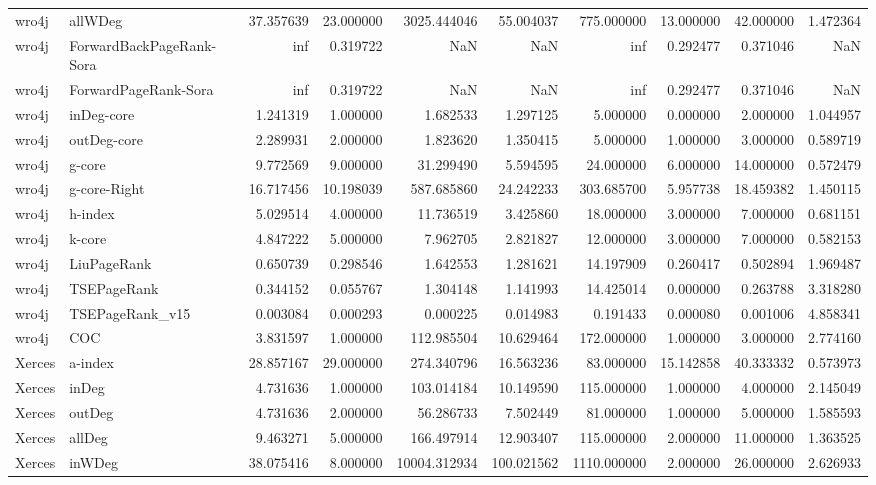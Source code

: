 \begin{tabular}{llrrrrrrrr}
wro4j & allWDeg & 37.357639 & 23.000000 & 3025.444046 & 55.004037 & 775.000000 & 13.000000 & 42.000000 & 1.472364 \\
wro4j & ForwardBackPageRank-Sora & inf & 0.319722 & NaN & NaN & inf & 0.292477 & 0.371046 & NaN \\
wro4j & ForwardPageRank-Sora & inf & 0.319722 & NaN & NaN & inf & 0.292477 & 0.371046 & NaN \\
wro4j & inDeg-core & 1.241319 & 1.000000 & 1.682533 & 1.297125 & 5.000000 & 0.000000 & 2.000000 & 1.044957 \\
wro4j & outDeg-core & 2.289931 & 2.000000 & 1.823620 & 1.350415 & 5.000000 & 1.000000 & 3.000000 & 0.589719 \\
wro4j & g-core & 9.772569 & 9.000000 & 31.299490 & 5.594595 & 24.000000 & 6.000000 & 14.000000 & 0.572479 \\
wro4j & g-core-Right & 16.717456 & 10.198039 & 587.685860 & 24.242233 & 303.685700 & 5.957738 & 18.459382 & 1.450115 \\
wro4j & h-index & 5.029514 & 4.000000 & 11.736519 & 3.425860 & 18.000000 & 3.000000 & 7.000000 & 0.681151 \\
wro4j & k-core & 4.847222 & 5.000000 & 7.962705 & 2.821827 & 12.000000 & 3.000000 & 7.000000 & 0.582153 \\
wro4j & LiuPageRank & 0.650739 & 0.298546 & 1.642553 & 1.281621 & 14.197909 & 0.260417 & 0.502894 & 1.969487 \\
wro4j & TSEPageRank & 0.344152 & 0.055767 & 1.304148 & 1.141993 & 14.425014 & 0.000000 & 0.263788 & 3.318280 \\
wro4j & TSEPageRank_v15 & 0.003084 & 0.000293 & 0.000225 & 0.014983 & 0.191433 & 0.000080 & 0.001006 & 4.858341 \\
wro4j & COC & 3.831597 & 1.000000 & 112.985504 & 10.629464 & 172.000000 & 1.000000 & 3.000000 & 2.774160 \\
Xerces & a-index & 28.857167 & 29.000000 & 274.340796 & 16.563236 & 83.000000 & 15.142858 & 40.333332 & 0.573973 \\
Xerces & inDeg & 4.731636 & 1.000000 & 103.014184 & 10.149590 & 115.000000 & 1.000000 & 4.000000 & 2.145049 \\
Xerces & outDeg & 4.731636 & 2.000000 & 56.286733 & 7.502449 & 81.000000 & 1.000000 & 5.000000 & 1.585593 \\
Xerces & allDeg & 9.463271 & 5.000000 & 166.497914 & 12.903407 & 115.000000 & 2.000000 & 11.000000 & 1.363525 \\
Xerces & inWDeg & 38.075416 & 8.000000 & 10004.312934 & 100.021562 & 1110.000000 & 2.000000 & 26.000000 & 2.626933 \\

\end{tabular}
